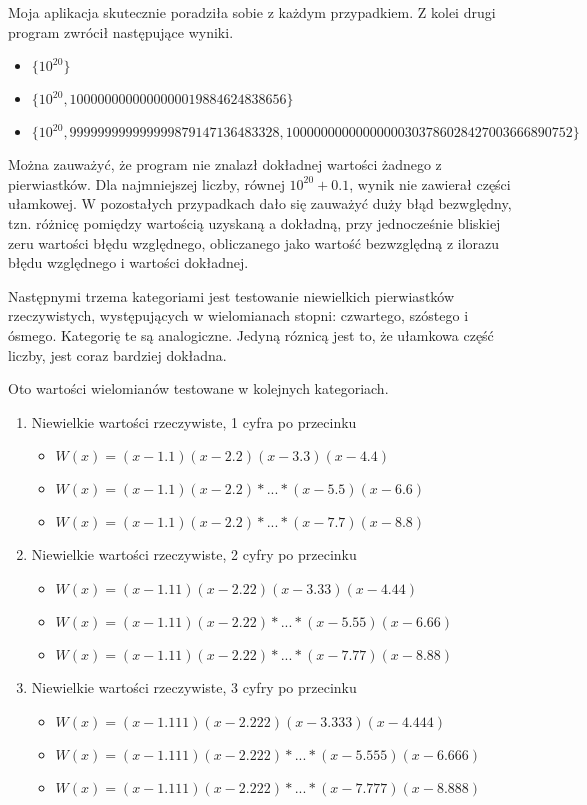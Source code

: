 \documentclass[oneside,a4paper]{book}
\begin{document}
	Moja aplikacja skutecznie poradziła sobie z każdym przypadkiem. Z kolei drugi program zwrócił następujące wyniki.
	\begin{itemize}
		\item $\{10^{20}\}$
		\item $\{10^{20}, 1000000000000000019884624838656\}$
		\item $\{10^{20}, 999999999999999879147136483328, 10000000000000000303786028427003666890752\}$
	\end{itemize}

	Można zauważyć, że program nie znalazł dokładnej wartości żadnego z pierwiastków. Dla najmniejszej liczby, równej $10^{20}+0.1$, wynik nie zawierał części ułamkowej. W pozostałych przypadkach dało się zauważyć duży błąd bezwględny, tzn. różnicę pomiędzy wartością uzyskaną a dokładną, przy jednocześnie bliskiej zeru wartości błędu względnego, obliczanego jako wartość bezwzględną z ilorazu błędu względnego i wartości dokładnej.
	
	Następnymi trzema kategoriami jest testowanie niewielkich pierwiastków rzeczywistych, występujących w wielomianach stopni: czwartego, szóstego i ósmego. Kategorię te są analogiczne. Jedyną róznicą jest to, że ułamkowa część liczby, jest coraz bardziej dokładna.
	
	Oto wartości wielomianów testowane w kolejnych kategoriach.
	
	\begin{enumerate}
		\item Niewielkie wartości rzeczywiste, 1 cyfra po przecinku
		\begin{itemize}
			\item $W(x)=(x-1.1)(x-2.2)(x-3.3)(x-4.4)$
			\item $W(x)=(x-1.1)(x-2.2)*...*(x-5.5)(x-6.6)$
			\item $W(x)=(x-1.1)(x-2.2)*...*(x-7.7)(x-8.8)$
		\end{itemize}
		\item Niewielkie wartości rzeczywiste, 2 cyfry po przecinku
		\begin{itemize}
			\item $W(x)=(x-1.11)(x-2.22)(x-3.33)(x-4.44)$
			\item $W(x)=(x-1.11)(x-2.22)*...*(x-5.55)(x-6.66)$
			\item $W(x)=(x-1.11)(x-2.22)*...*(x-7.77)(x-8.88)$
		\end{itemize}
		\item Niewielkie wartości rzeczywiste, 3 cyfry po przecinku
		\begin{itemize}
			\item $W(x)=(x-1.111)(x-2.222)(x-3.333)(x-4.444)$
			\item $W(x)=(x-1.111)(x-2.222)*...*(x-5.555)(x-6.666)$
			\item $W(x)=(x-1.111)(x-2.222)*...*(x-7.777)(x-8.888)$
		\end{itemize}
	\end{enumerate}
	
\end{document}
